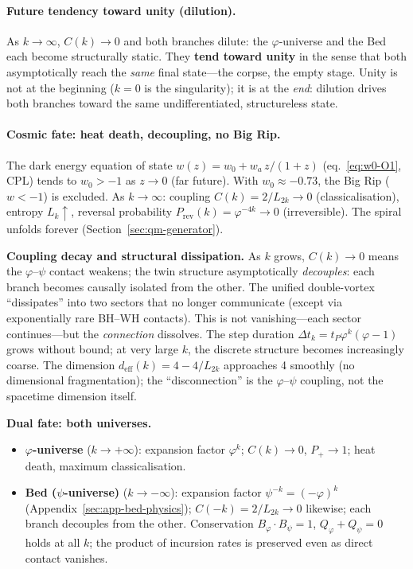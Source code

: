 \documentclass[12pt,a4paper]{article}
\begin{document}
\paragraph{Future tendency toward unity (dilution).}
As $k \to \infty$, $C(k) \to 0$ and both branches dilute: the $\varphi$-universe and the Bed each become structurally static. They \textbf{tend toward unity} in the sense that both asymptotically reach the \emph{same} final state---the corpse, the empty stage. Unity is not at the beginning ($k = 0$ is the singularity); it is at the \emph{end}: dilution drives both branches toward the same undifferentiated, structureless state.

\paragraph{Cosmic fate: heat death, decoupling, no Big Rip.}
The dark energy equation of state $w(z) = w_0 + w_a\,z/(1+z)$ (eq.~\ref{eq:w0-O1}, CPL) tends to $w_0 > -1$ as $z \to 0$ (far future). With $w_0 \approx -0.73$, the Big Rip ($w < -1$) is excluded. As $k \to \infty$: coupling $C(k) = 2/L_{2k} \to 0$ (classicalisation), entropy $L_k \uparrow$, reversal probability $P_{\mathrm{rev}}(k) = \varphi^{-4k} \to 0$ (irreversible). The spiral unfolds forever (Section~\ref{sec:qm-generator}).

\medskip
\noindent\textbf{Coupling decay and structural dissipation.} As $k$ grows, $C(k) \to 0$ means the $\varphi$--$\psi$ contact weakens; the twin structure asymptotically \emph{decouples}: each branch becomes causally isolated from the other. The unified double-vortex ``dissipates'' into two sectors that no longer communicate (except via exponentially rare BH--WH contacts). This is not vanishing---each sector continues---but the \emph{connection} dissolves. The step duration $\Delta t_k = t_P\varphi^k(\varphi{-}1)$ grows without bound; at very large $k$, the discrete structure becomes increasingly coarse. The dimension $d_{\mathrm{eff}}(k) = 4 - 4/L_{2k}$ approaches 4 smoothly (no dimensional fragmentation); the ``disconnection'' is the $\varphi$--$\psi$ coupling, not the spacetime dimension itself.

\medskip
\noindent\textbf{Dual fate: both universes.}
\begin{itemize}[nosep,leftmargin=*]
\item \textbf{$\varphi$-universe} ($k \to +\infty$): expansion factor $\varphi^k$; $C(k) \to 0$, $P_+ \to 1$; heat death, maximum classicalisation.
\item \textbf{Bed (}$\psi$\textbf{-universe)} ($k \to -\infty$): expansion factor $\psi^{-k} = (-\varphi)^k$ (Appendix~\ref{sec:app-bed-physics}); $C(-k) = 2/L_{2k} \to 0$ likewise; each branch decouples from the other. Conservation $B_\varphi \cdot B_\psi = 1$, $Q_\varphi + Q_\psi = 0$ holds at all $k$; the product of incursion rates is preserved even as direct contact vanishes.
\end{itemize}
\end{document}
